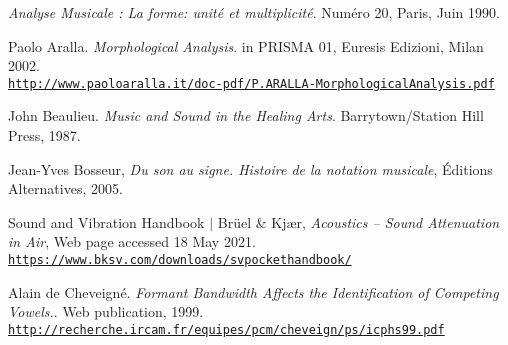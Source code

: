 
\renewcommand{\bibsection}{\part*{References}}

\thispagestyle{empty}

\renewcommand\bibpreamble{$\rightarrow$ The references to go further or deeper for advanced readers are prepended by an asterisk.}

\begin{thebibliography}{99}
		
	\textit{Analyse Musicale : La forme: unit\'{e} et multiplicit\'{e}}. Num\'{e}ro 20, Paris, Juin 1990.
	
	Paolo Aralla. \textit{Morphological Analysis}. in PRISMA 01, Euresis Edizioni, Milan 2002.\\ 
	\href{http://www.paoloaralla.it/doc-pdf/P.ARALLA-MorphologicalAnalysis.pdf}{\scriptsize{\texttt{http://www.paoloaralla.it/doc-pdf/P.ARALLA-MorphologicalAnalysis.pdf}}} \normalsize{}
	
	John Beaulieu. \textit{Music and Sound in the Healing Arts}. Barrytown/Station Hill Press, 1987.
	
	Jean-Yves Bosseur, \textit{Du son au signe. Histoire de la notation musicale}, \'{E}ditions Alternatives, 2005.
	
	Sound and Vibration Handbook $|$ Br\"uel \& Kj\ae r, \textit{Acoustics -- Sound Attenuation in Air}, Web page accessed 18 May 2021.\\ 
	\href{https://www.bksv.com/downloads/svpockethandbook/}{\scriptsize{\texttt{https://www.bksv.com/downloads/svpockethandbook/}}} \normalsize{}
		
	Alain de Cheveign\'{e}. \textit{Formant Bandwidth Affects the Identification of Competing Vowels.}. Web publication, 1999.\\ \href{http://recherche.ircam.fr/equipes/pcm/cheveign/ps/icphs99.pdf}{\scriptsize{\texttt{http://recherche.ircam.fr/equipes/pcm/cheveign/ps/icphs99.pdf}}} \normalsize{}


\end{thebibliography}
